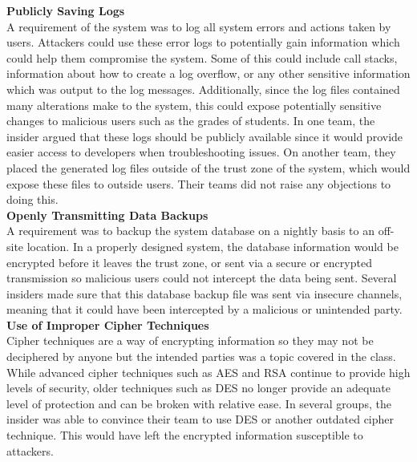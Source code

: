 \documentclass[conference]{IEEEtran}
\begin{document}
\textbf{Publicly Saving Logs}\\
A requirement of the system was to log all system errors and actions taken by users. Attackers could use these error logs to potentially gain information which could help them compromise the system. Some of this could include call stacks, information about how to create a log overflow, or any other sensitive information which was output to the log messages. Additionally, since the log files contained many alterations make to the system, this could expose potentially sensitive changes to malicious users such as the grades of students. In one team, the insider argued that these logs should be publicly available since it would provide easier access to developers when troubleshooting issues. On another team, they placed the generated log files outside of the trust zone of the system, which would expose these files to outside users. Their teams did not raise any objections to doing this. \\


\textbf{Openly Transmitting Data Backups}\\
A requirement was to backup the system database on a nightly basis to an off-site location. In a properly designed system, the database information would be encrypted before it leaves the trust zone, or sent via a secure or encrypted transmission so malicious users could not intercept the data being sent. Several insiders made sure that this database backup file was sent via insecure channels, meaning that it could have been intercepted by a malicious or unintended party. \\


\textbf{Use of Improper Cipher Techniques}\\
Cipher techniques are a way of encrypting information so they may not be deciphered by anyone but the intended parties was a topic covered in the class. While advanced cipher techniques such as AES and RSA continue to provide high levels of security, older techniques such as DES no longer provide an adequate level of protection and can be broken with relative ease. In several groups, the insider was able to convince their team to use DES or another outdated cipher technique. This would have left the encrypted information susceptible to attackers. \\
\end{document}
